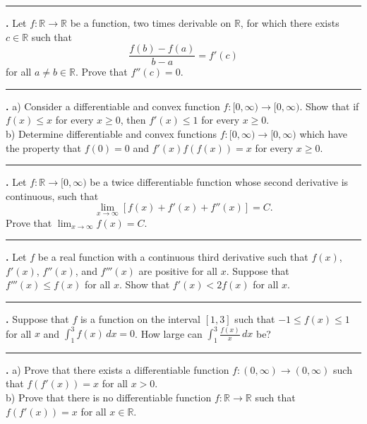 \documentclass[11pt]{article}
\newcounter{probnum}
\newenvironment{problembox}{\par\noindent\rule{\linewidth}{0.5pt}\vspace{5pt}\par}{\vspace{2pt}}
\begin{document}
\begin{problembox}
\textbf{\theprobnum.} Let $f : \mathbb{R} \to \mathbb{R}$ be a function, two times derivable on $\mathbb{R}$, for which there exists $c \in \mathbb{R}$ such that
\[
\frac{f(b)-f(a)}{b-a} = f'(c)
\]
for all $a \ne b \in \mathbb{R}$. Prove that $f''(c) = 0$.
\end{problembox}

\begin{problembox}
\textbf{\theprobnum.} a) Consider a differentiable and convex function $f : [0,\infty) \to [0,\infty)$. Show that if $f(x) \le x$ for every $x \ge 0$, then $f'(x) \le 1$ for every $x \ge 0$.\\
b) Determine differentiable and convex functions $f : [0,\infty) \to [0,\infty)$ which have the property that $f(0) = 0$ and $f'(x) f(f(x)) = x$ for every $x \ge 0$.
\end{problembox}

\begin{problembox}
\textbf{\theprobnum.} Let $f : \mathbb{R} \to [0,\infty)$ be a twice differentiable function whose second derivative is continuous, such that
\[
\lim_{x \to \infty} \left[f(x) + f'(x) + f''(x)\right] = C.
\]
Prove that $\displaystyle\lim_{x \to \infty} f(x) = C$.
\end{problembox}

\begin{problembox}
\textbf{\theprobnum.} Let $f$ be a real function with a continuous third derivative such that $f(x)$, $f'(x)$, $f''(x)$, and $f'''(x)$ are positive for all $x$. Suppose that $f'''(x) \le f(x)$ for all $x$. Show that $f'(x) < 2f(x)$ for all $x$.
\end{problembox}

\begin{problembox}
\textbf{\theprobnum.} Suppose that $f$ is a function on the interval $[1,3]$ such that $-1 \le f(x) \le 1$ for all $x$ and $\displaystyle\int_1^3 f(x)\,dx = 0$. How large can $\displaystyle\int_1^3 \frac{f(x)}{x}\,dx$ be?
\end{problembox}

\begin{problembox}
\textbf{\theprobnum.} a) Prove that there exists a differentiable function $f : (0,\infty) \to (0,\infty)$ such that $f(f'(x)) = x$ for all $x > 0$.\\
b) Prove that there is no differentiable function $f : \mathbb{R} \to \mathbb{R}$ such that $f(f'(x)) = x$ for all $x \in \mathbb{R}$.
\end{problembox}
\end{document}
